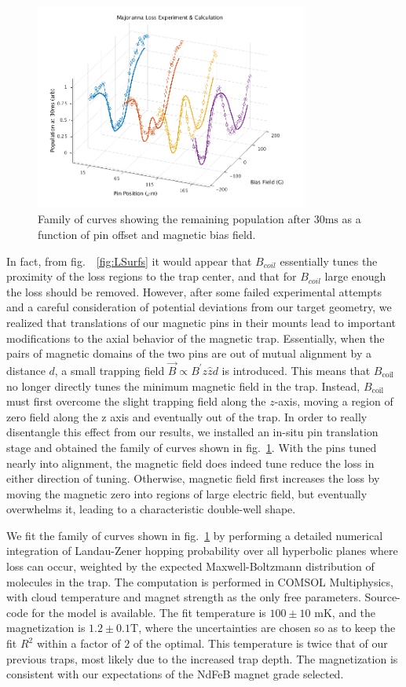 \documentclass[%
 reprint,
 amsmath,amssymb,
 aps,
prl,
]{revtex4-1}
\begin{document}
\begin{figure}
\includegraphics[width=90mm]{V-to-W-plot-3D-dave.png}%
\caption{
Family of curves showing the remaining population after $30 \text{ms}$ as a function of pin offset and magnetic bias field.
\label{fig:WVplot}}
\end{figure}

In fact, from fig.~~\ref{fig:LSurfs} it would appear that $B_{coil}$ essentially tunes the proximity of the loss regions to the trap center, and that for $B_{coil}$ large enough the loss should be removed. However, after some failed experimental attempts and a careful consideration of potential deviations from our target geometry, we realized that translations of our magnetic pins in their mounts lead to important modifications to the axial behavior of the magnetic trap. Essentially, when the pairs of magnetic domains of the two pins are out of mutual alignment by a distance $d$, a small trapping field $\vec{B}\propto B^\prime z\hat{z} d$ is introduced. This means that $B_\text{coil}$ no longer directly tunes the minimum magnetic field in the trap. Instead, $B_\text{coil}$ must first overcome the slight trapping field along the $z$-axis, moving a region of zero field along the z axis and eventually out of the trap. In order to really disentangle this effect from our results, we installed an in-situ pin translation stage and obtained the family of curves shown in fig.~\ref{fig:WVplot}. With the pins tuned nearly into alignment, the magnetic field does indeed tune reduce the loss in either direction of tuning. Otherwise, magnetic field first increases the loss by moving the magnetic zero into regions of large electric field, but eventually overwhelms it, leading to a characteristic double-well shape. 

We fit the family of curves shown in fig.~\ref{fig:WVplot} by performing a detailed numerical integration of Landau-Zener hopping probability over all hyperbolic planes where loss can occur, weighted by the expected Maxwell-Boltzmann distribution of molecules in the trap. The computation is performed in COMSOL Multiphysics, with cloud temperature and magnet strength as the only free parameters. Source-code for the model is available.\cite{ref:githubCOMcode} The fit temperature is $100\pm10\text{ mK}$, and the magnetization is $1.2\pm0.1\text{T}$, where the uncertainties are chosen so as to keep the fit $R^2$ within a factor of $2$ of the optimal. This temperature is twice that of our previous traps, most likely due to the increased trap depth. The magnetization is consistent with our expectations of the NdFeB magnet grade selected.
\end{document}
